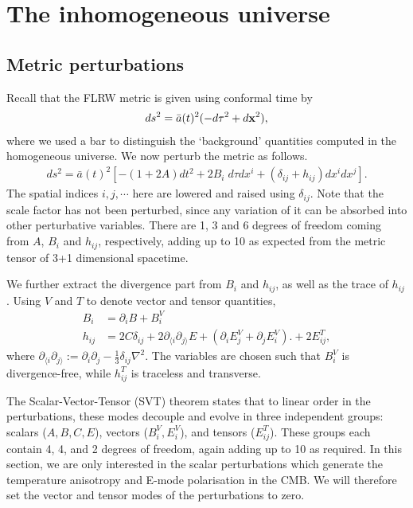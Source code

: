 \section{The inhomogeneous universe} \label{section:the_inhomogeneous_universe}

\subsection{Metric perturbations} \label{section:metric_perturbations}
Recall that the FLRW metric is given using conformal time by
\begin{align}
	ds^2 = \bar{a}(t)^2 (-d\tau^2 + d\mathbf{x}^2),
\end{align}
where we used a bar to distinguish the `background' quantities computed in the homogeneous universe. We now perturb the metric as follows.
\begin{align}
	ds^2 = \bar{a}(t)^2 \left[ -(1+2A) dt^2 + 2B_i \; d\tau dx^i + (\delta_{ij} + h_{ij}) dx^i dx^j \right].
\end{align}
The spatial indices $i,j,\cdots$ here are lowered and raised using $\delta_{ij}$. Note that the scale factor has not been perturbed, since any variation of it can be absorbed into other perturbative variables. There are 1, 3 and 6 degrees of freedom coming from $A$, $B_i$ and $h_{ij}$, respectively, adding up to 10 as expected from the metric tensor of 3+1 dimensional spacetime.

We further extract the divergence part from $B_i$ and $h_{ij}$, as well as the trace of $h_{ij}$. Using $V$ and $T$ to denote vector and tensor quantities, 
\begin{align}
	B_i &= \partial_i B + B_i^V \\
	h_{ij} &= 2C \delta_{ij} + 2\partial_{\langle i}\partial_{j \rangle} E + (\partial_i E_j^V + \partial_j E_i^V). + 2E^T_{ij},
\end{align}
where $\partial_{\langle i}\partial_{j \rangle} := \partial_i \partial_j - \frac{1}{3} \delta_{ij} \nabla^2$.
The variables are chosen such that $B_i^V$ is divergence-free, while $h_{ij}^T$ is traceless and transverse.

The Scalar-Vector-Tensor (SVT) theorem states that to linear order in the perturbations, these modes decouple and evolve in three independent groups: scalars ($A,B,C,E$), vectors ($B_i^V,E_i^V$), and tensors ($E_{ij}^T$). These groups each contain 4, 4, and 2 degrees of freedom, again adding up to 10 as required. In this section, we are only interested in the scalar perturbations which generate the temperature anisotropy and E-mode polarisation in the CMB. We will therefore set the vector and tensor modes of the perturbations to zero.

